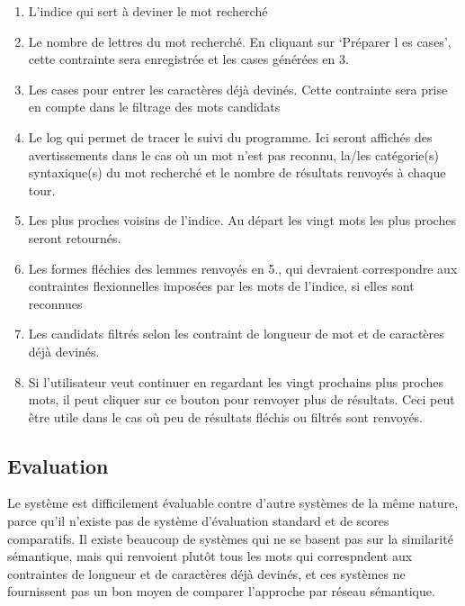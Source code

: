 \begin{enumerate}
    \item{L'indice qui sert à deviner le mot recherché}
    \item{Le nombre de lettres du mot recherché. En cliquant sur \lq{Préparer l
    es cases}\rq, cette contrainte sera enregistrée et les cases générées en 3.}
    \item{Les cases pour entrer les caractères déjà devinés. Cette contrainte 
    sera prise en compte dans le filtrage des mots candidats}
    \item{Le log qui permet de tracer le suivi du programme. Ici seront 
    affichés des avertissements dans le cas où un mot n'est pas reconnu, la/les 
    catégorie(s) syntaxique(s) du mot recherché et le nombre de résultats 
    renvoyés à chaque tour.}
    \item{Les plus proches voisins de l'indice. Au départ les vingt mots les 
    plus proches seront retournés.}
    \item{Les formes fléchies des lemmes renvoyés en 5., qui devraient 
    correspondre aux contraintes flexionnelles imposées par les mots de 
    l'indice, si elles sont reconnues}
    \item{Les candidats filtrés selon les contraint de longueur de mot et de 
    caractères déjà devinés.}
    \item{Si l'utilisateur veut continuer en regardant les vingt prochains plus 
    proches mots, il peut cliquer sur ce bouton pour renvoyer plus de 
    résultats. Ceci peut être utile dans le cas où peu de résultats fléchis ou 
    filtrés sont renvoyés.}
    
\end{enumerate}


\subsection{Evaluation}
Le système est difficilement évaluable contre d'autre systèmes de la même 
nature, parce qu'il n'existe pas de système d'évaluation standard et de scores 
comparatifs. Il existe beaucoup de systèmes qui ne se basent pas sur la 
similarité sémantique, mais qui renvoient plutôt tous les mots qui correspndent 
aux contraintes de longueur et de caractères déjà devinés, et ces systèmes ne 
fournissent pas un bon moyen de comparer l'approche par réseau sémantique.

